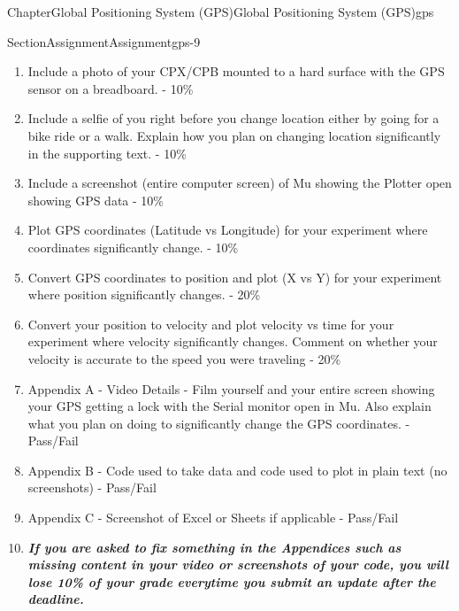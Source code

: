 \documentclass[oneside,10pt,]{book}
\newcommand{\alert}[1]{\textbf{\textit{#1}}}
\numberwithin{equation}{section}
\begin{document}
\begin{chapterptx}{Chapter}{Global Positioning System (GPS)}{}{Global Positioning System (GPS)}{}{}{gps}
\begin{sectionptx}{Section}{Assignment}{}{Assignment}{}{}{gps-9}
\begin{introduction}{}
\begin{enumerate}
\item{}Include a photo of your CPX\slash{}CPB mounted to a hard surface with the GPS sensor on a breadboard. - 10\%%
\item{}Include a selfie of you right before you change location either by going for a bike ride or a walk. Explain how you plan on changing location significantly in the supporting text. - 10\%%
\item{}Include a screenshot (entire computer screen) of Mu showing the Plotter open showing GPS data - 10\%%
\item{}Plot GPS coordinates (Latitude vs Longitude) for your experiment where coordinates significantly change. - 10\%%
\item{}Convert GPS coordinates to position and plot (X vs Y) for your experiment where position significantly changes. - 20\%%
\item{}Convert your position to velocity and plot velocity vs time for your experiment where velocity significantly changes. Comment on whether your velocity is accurate to the speed you were traveling - 20\%%
\item{}Appendix A - Video Details - Film yourself and your entire screen showing your GPS getting a lock with the Serial monitor open in Mu. Also explain what you plan on doing to significantly change the GPS coordinates. - Pass\slash{}Fail%
\item{}Appendix B - Code used to take data and code used to plot in plain text (no screenshots) - Pass\slash{}Fail%
\item{}Appendix C - Screenshot of Excel or Sheets if applicable - Pass\slash{}Fail%
\item{}\alert{If you are asked to fix something in the Appendices such as missing content in your video or screenshots of your code, you will lose 10\% of your grade everytime you submit an update after the deadline.}%
\end{enumerate}
\end{introduction}%
\end{sectionptx}
\end{chapterptx}
%
%
\typeout{************************************************}
\typeout{************************************************}
%
\end{document}
